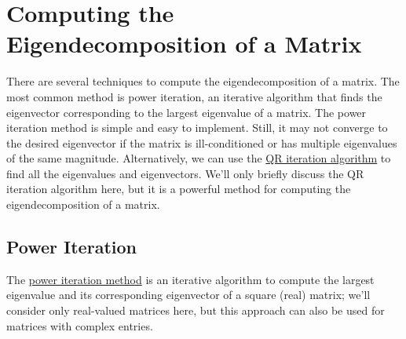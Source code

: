 \documentclass{article}[11pt]
\begin{document}
\section{Computing the Eigendecomposition of a Matrix}
There are several techniques to compute the eigendecomposition of a matrix. 
The most common method is power iteration, an iterative algorithm that finds the eigenvector corresponding to the largest eigenvalue of a matrix. The power iteration method is simple and easy to implement. Still, it may not converge to the desired eigenvector if the matrix is ill-conditioned or has multiple eigenvalues of the same magnitude.
Alternatively, we can use the \href{https://en.wikipedia.org/wiki/QR_algorithm}{QR iteration algorithm} to find all the eigenvalues and eigenvectors.
We'll only briefly discuss the QR iteration algorithm here, but it is a powerful method for computing the eigendecomposition of a matrix.

\subsection{Power Iteration}
The \href{https://en.wikipedia.org/wiki/Power_iteration}{power iteration method} 
is an iterative algorithm to compute the largest eigenvalue and its corresponding eigenvector of a square (real) matrix; we'll consider only real-valued matrices here, 
but this approach can also be used for matrices with complex entries. 
\end{document}

